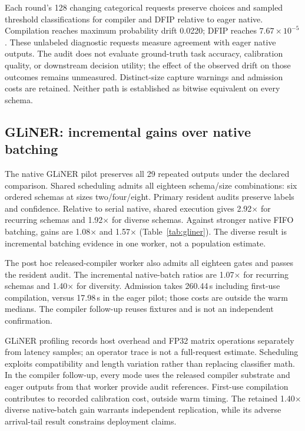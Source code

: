 \documentclass[10pt,twocolumn]{article}
\begin{document}
Each round's 128 changing categorical requests preserve choices and sampled threshold classifications for compiler and DFIP relative to eager native. Compilation reaches maximum probability drift 0.0220; DFIP reaches $7.67\times10^{-5}$. These unlabeled diagnostic requests measure agreement with eager native outputs. The audit does not evaluate ground-truth task accuracy, calibration quality, or downstream decision utility; the effect of the observed drift on those outcomes remains unmeasured. Distinct-size capture warnings and admission costs are retained. Neither path is established as bitwise equivalent on every schema.

\subsection{GLiNER: incremental gains over native batching}
The native GLiNER pilot preserves all 29 repeated outputs under the declared comparison. Shared scheduling admits all eighteen schema/size combinations: six ordered schemas at sizes two/four/eight. Primary resident audits preserve labels and confidence. Relative to serial native, shared execution gives 2.92$\times$ for recurring schemas and 1.92$\times$ for diverse schemas. Against stronger native FIFO batching, gains are 1.08$\times$ and 1.57$\times$ (Table~\ref{tab:gliner}). The diverse result is incremental batching evidence in one worker, not a population estimate.

\begin{table}[t]
\centering\small

\caption{GLiNER resident traces, 96 records each. Each substrate has one worker and five paired randomized warm timings. Ratios divide baseline median by shared-scheduler median. Audits compare exposed labels and confidence. Compilation is a post hoc follow-up with reused fixtures, not independent confirmatory replication.}
\label{tab:gliner}
\end{table}

The post hoc released-compiler worker also admits all eighteen gates and passes the resident audit. The incremental native-batch ratios are 1.07$\times$ for recurring schemas and 1.40$\times$ for diversity. Admission takes 260.44\,s including first-use compilation, versus 17.98\,s in the eager pilot; those costs are outside the warm medians. The compiler follow-up reuses fixtures and is not an independent confirmation.

GLiNER profiling records host overhead and FP32 matrix operations separately from latency samples; an operator trace is not a full-request estimate. Scheduling exploits compatibility and length variation rather than replacing classifier math. In the compiler follow-up, every mode uses the released compiler substrate and eager outputs from that worker provide audit references. First-use compilation contributes to recorded calibration cost, outside warm timing. The retained 1.40$\times$ diverse native-batch gain warrants independent replication, while its adverse arrival-tail result constrains deployment claims.
\end{document}
